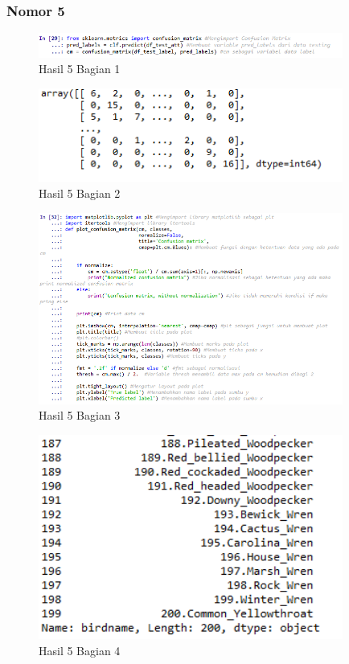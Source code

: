 \subsubsection{Nomor 5}
\hfill\break

\begin{figure}[H]
\centerline{\includegraphics[width=10cm]{figures/1174077/3/25.png}}
\caption{Hasil 5 Bagian 1}
\label{labelgambar}
\end{figure}


\begin{figure}[H]
\centerline{\includegraphics[width=10cm]{figures/1174077/3/26.png}}
\caption{Hasil 5 Bagian 2}
\label{labelgambar}
\end{figure}


\begin{figure}[H]
\centerline{\includegraphics[width=10cm]{figures/1174077/3/27.png}}
\caption{Hasil 5 Bagian 3}
\label{labelgambar}
\end{figure}


\begin{figure}[H]
\centerline{\includegraphics[width=10cm]{figures/1174077/3/28.png}}
\caption{Hasil 5 Bagian 4}
\label{labelgambar}
\end{figure}

